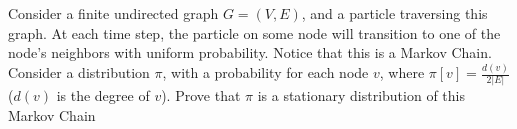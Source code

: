 
Consider a finite undirected graph $G = (V, E)$, and a particle 
traversing this graph. At each time step, the particle on some 
node will transition to one of the node's neighbors with uniform 
probability. Notice that this is a Markov Chain. Consider a distribution 
$\pi$, with a probability for each node $v$, where 
$\pi[v] = \frac{d(v)}{2|E|}$ ($d(v)$ is the degree of $v$). 
Prove that $\pi$ is a stationary distribution of this Markov Chain




